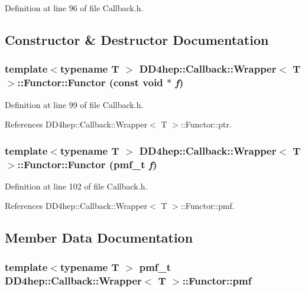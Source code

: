 Definition at line 96 of file Callback.h.

\subsection{Constructor \& Destructor Documentation}
\hypertarget{union_d_d4hep_1_1_callback_1_1_wrapper_1_1_functor_aa5d398e7679a40c08f44253099d14476}{
\subsubsection[{Functor}]{\setlength{\rightskip}{0pt plus 5cm}template$<$typename T $>$ {\bf DD4hep::Callback::Wrapper}$<$ {\bf T} $>$::Functor::Functor (const void $\ast$ {\em f})}}
\label{union_d_d4hep_1_1_callback_1_1_wrapper_1_1_functor_aa5d398e7679a40c08f44253099d14476}


Definition at line 99 of file Callback.h.

References DD4hep::Callback::Wrapper$<$ T $>$::Functor::ptr.\hypertarget{union_d_d4hep_1_1_callback_1_1_wrapper_1_1_functor_a866665797965a87012088cfc1444a0ca}{
\subsubsection[{Functor}]{\setlength{\rightskip}{0pt plus 5cm}template$<$typename T $>$ {\bf DD4hep::Callback::Wrapper}$<$ {\bf T} $>$::Functor::Functor ({\bf pmf\_\-t} {\em f})}}
\label{union_d_d4hep_1_1_callback_1_1_wrapper_1_1_functor_a866665797965a87012088cfc1444a0ca}


Definition at line 102 of file Callback.h.

References DD4hep::Callback::Wrapper$<$ T $>$::Functor::pmf.

\subsection{Member Data Documentation}
\hypertarget{union_d_d4hep_1_1_callback_1_1_wrapper_1_1_functor_afbf0fb7951a0a816b42866d0492628d3}{
\subsubsection[{pmf}]{\setlength{\rightskip}{0pt plus 5cm}template$<$typename T $>$ {\bf pmf\_\-t} {\bf DD4hep::Callback::Wrapper}$<$ {\bf T} $>$::{\bf Functor::pmf}}}
\label{union_d_d4hep_1_1_callback_1_1_wrapper_1_1_functor_afbf0fb7951a0a816b42866d0492628d3}


